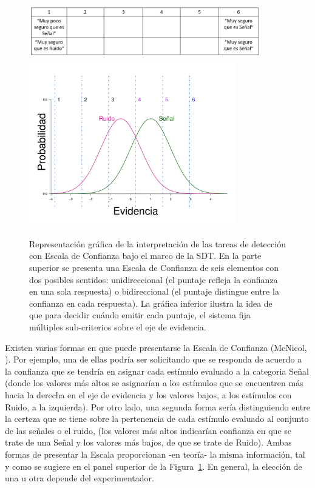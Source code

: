 \begin{itemize}
\begin{figure}[p]
\centering
\includegraphics[width=0.9\textwidth]{Figures/Puntajes_Criterios}\\
\includegraphics[width=0.8\textwidth]{Figures/ConfidenceRating}\\
\decoRule
\caption[Tareas de detección con Escala de Confianza y su interpretación]{Representación gráfica de la interpretación de las tareas de detección con Escala de Confianza bajo el marco de la SDT. En la parte superior se presenta una Escala de Confianza de seis elementos con dos posibles sentidos: unidireccional (el puntaje refleja la confianza en una sola respuesta) o bidireccional (el puntaje distingue entre la confianza en cada respuesta). La gráfica inferior ilustra la idea de que para decidir cuándo emitir cada puntaje, el sistema fija múltiples sub-criterios sobre el eje de evidencia.}
\label{fig:Conf_Rat}
\end{figure}

Existen varias formas en que puede presentarse la Escala de Confianza (McNicol, \citeyear{McNicol2}). Por ejemplo, una de ellas podría ser solicitando que se responda de acuerdo a la confianza que se tendría en asignar cada estímulo evaluado a la categoria Señal (donde los valores más altos se asignarían a los estímulos que se encuentren más hacia la derecha en el eje de evidencia y los valores bajos, a los estímulos con Ruido, a la izquierda). Por otro lado, una segunda forma sería distinguiendo entre la certeza que se tiene sobre la pertenencia de cada estímulo evaluado al conjunto de las señales o el ruido, (los valores más altos indicarían confianza en que se trate de una Señal y los valores más bajos, de que se trate de Ruido). Ambas formas de presentar la Escala proporcionan -en teoría- la misma información, tal y como se sugiere en el panel superior de la Figura~\ref{fig:Conf_Rat}. En general, la elección de una u otra depende del experimentador.\\


\end{itemize}
